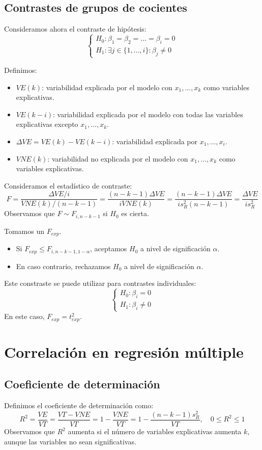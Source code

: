 \subsection*{Contrastes de grupos de cocientes}
Consideramos ahora el contraste de hipótesis:
$$\begin{cases}
        H_0: \beta_1 = \beta_2 = \dots = \beta_i = 0 \\
        H_1: \exists j \in \{1, \dots, i\} : \beta_j \neq 0
    \end{cases}$$

Definimos:
\begin{itemize}
    \item $VE(k)$: variabilidad explicada por el modelo con $x_1, \dots, x_k$ como variables explicativas.
    \item $VE(k-i)$: variabilidad explicada por el modelo con todas las variables explicativas excepto $x_1, \dots, x_k$.
    \item $\Delta VE = VE(k) - VE(k-i)$: variabilidad explicada por $x_1, \dots, x_i$.
    \item $VNE(k)$: variabilidad no explicada por el modelo con $x_1, \dots, x_k$ como variables explicativas.
\end{itemize}

Consideramos el estadístico de contraste:
$$F = \frac{\Delta VE / i}{VNE(k) / (n-k-1)} = \frac{(n-k-1)\Delta VE}{iVNE(k)} = \frac{(n-k-1)\Delta VE}{is_R^2(n-k-1)} = \frac{\Delta VE}{is_R^2}$$
Observamos que $F \sim F_{i, n-k-1}$ si $H_0$ es cierta.

Tomamos un $F_{exp}$.
\begin{itemize}
    \item Si $F_{exp} \leq F_{i, n-k-1, 1-\alpha}$, aceptamos $H_0$ a nivel de significación $\alpha$.
    \item En caso contrario, rechazamos $H_0$ a nivel de significación $\alpha$.
\end{itemize}

Este constraste se puede utilizar para contrastes individuales:
$$\begin{cases}
        H_0: \beta_i = 0 \\
        H_1: \beta_i \neq 0
    \end{cases}$$
En este caso, $F_{exp} = t_{exp}^2$.

\section{Correlación en regresión múltiple}
\subsection*{Coeficiente de determinación}
Definimos el coeficiente de determinación como:
$$R^2 = \frac{VE}{VT} = \frac{VT - VNE}{VT} = 1 - \frac{VNE}{VT} = 1 - \frac{(n-k-1)s_R^2}{VT}, \quad 0 \leq R^2 \leq 1$$
Observamos que $R^2$ aumenta si el número de variables explicativas aumenta $k$, aunque las variables no sean significativas.

